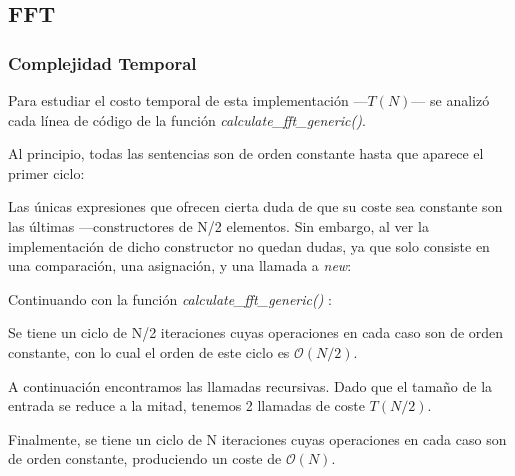 \documentclass{article}
\begin{document}
  \subsection{FFT}
    \subsubsection{Complejidad Temporal}
      Para estudiar el costo temporal de esta implementación ---$T(N)$--- se analizó
    cada línea de código de la función \textit{calculate\_fft\_generic()}.\par
    Al principio, todas las sentencias son de orden constante hasta que
    aparece el primer ciclo:
    
      Las únicas expresiones que ofrecen cierta duda de que su coste sea 
    constante son las últimas ---constructores de N/2 elementos. Sin embargo,
    al ver la implementación de dicho constructor no quedan dudas, ya que solo
    consiste en una comparación, una asignación, y una llamada a \textit{new}:
    
      Continuando con la función \textit{calculate\_fft\_generic()} :
    
      Se tiene un ciclo de N/2 iteraciones cuyas operaciones en cada caso
    son de orden constante, con lo cual el orden de este ciclo es $\mathcal{O}(N/2)$. \par
      A continuación encontramos las llamadas recursivas. Dado que el tamaño
     de la entrada se reduce a la mitad, tenemos 2 llamadas de coste $T(N/2)$. \par
      Finalmente, se tiene un ciclo de N iteraciones cuyas operaciones en cada 
    caso son de orden constante, produciendo un coste de $\mathcal{O}(N)$.
\end{document}
